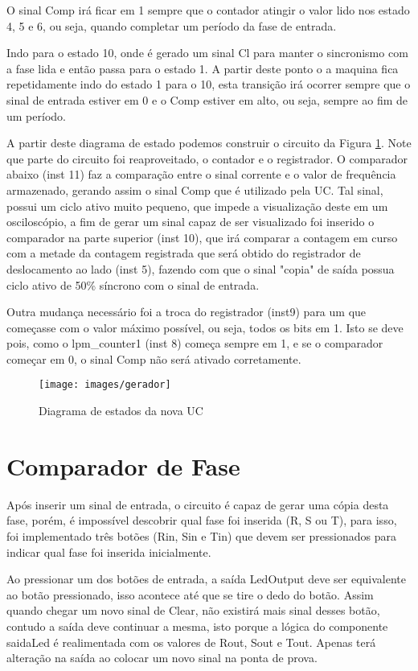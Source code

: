 O sinal Comp irá ficar em 1 sempre que o contador atingir o valor lido nos estado 4, 5 e 6, ou seja, quando completar um período da fase de entrada.

Indo para o estado 10, onde é gerado um sinal Cl para manter o sincronismo com a fase lida e então passa para o estado 1. A partir deste ponto o a maquina fica repetidamente indo do estado 1 para o 10, esta transição irá ocorrer sempre que o sinal de entrada estiver em 0 e o Comp estiver em alto, ou seja, sempre ao fim de um período.

A partir deste diagrama de estado podemos construir o circuito da Figura \ref{fig:gerador}. Note que parte do circuito foi reaproveitado, o contador e o registrador. O comparador abaixo (inst 11) faz a comparação entre o sinal corrente e o valor de frequência armazenado, gerando assim o sinal Comp que é utilizado pela UC. Tal sinal, possui um ciclo ativo muito pequeno, que impede a visualização deste em um osciloscópio, a fim de gerar um sinal capaz de ser visualizado foi inserido o comparador na parte superior (inst 10), que irá comparar a contagem em curso com a metade da contagem registrada que será obtido do registrador de deslocamento ao lado (inst 5), fazendo com que o sinal "copia" de saída possua ciclo ativo de 50\% síncrono com o sinal de entrada.

Outra mudança necessário foi a troca do registrador (inst9) para um que começasse com o valor máximo possível, ou seja, todos os bits em 1. Isto se deve pois, como o lpm\_counter1 (inst 8) começa sempre em 1, e se o comparador começar em 0, o sinal Comp não será ativado corretamente.

\begin{figure}[!htp]
	\centering
	\caption{Diagrama de estados da nova UC}
	\texttt{[image: images/gerador]}
	\label{fig:gerador}
\end{figure}

\section{Comparador de Fase}

Após inserir um sinal de entrada, o circuito é capaz de gerar uma cópia desta fase, porém, é impossível descobrir qual fase foi inserida (R, S ou T), para isso, foi implementado três botões (Rin, Sin e Tin) que devem ser pressionados para indicar qual fase foi inserida inicialmente.

Ao pressionar um dos botões de entrada, a saída LedOutput deve ser equivalente ao botão pressionado, isso acontece até que se tire o dedo do botão. Assim quando chegar um novo sinal de Clear, não existirá mais sinal desses botão, contudo a saída deve continuar a mesma, isto porque a lógica do componente saidaLed é realimentada com os valores de Rout, Sout e Tout. Apenas terá alteração na saída ao colocar um novo sinal na ponta de prova.

